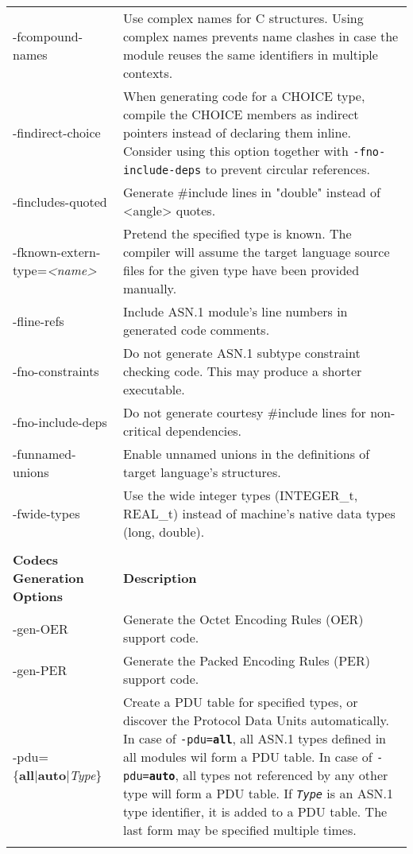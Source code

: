 \documentclass[english,oneside,12pt]{book}
\begin{document}
\begin{longtable}{lp{4in}}
{\ttfamily -fcompound-names} & {\small Use complex names for C structures. Using complex names prevents
name clashes in case the module reuses the same identifiers in multiple
contexts.}\\
{\ttfamily -findirect-choice} & {\small When generating code for a CHOICE type, compile the CHOICE
members as indirect pointers instead of declaring them inline. Consider
using this option together with \texttt{-fno-include-deps}
to prevent circular references.}\\
{\ttfamily -fincludes-quoted} & {\small Generate \#include lines in "double" instead of <angle> quotes.}\\
{\ttfamily -fknown-extern-type=\emph{<name>}} & {\small Pretend the specified type is known. The compiler will assume
the target language source files for the given type have been provided
manually. }\\
{\ttfamily -fline-refs} & {\small Include ASN.1 module's line numbers in generated code comments.}\\
{\ttfamily -fno-constraints} & {\small Do not generate ASN.1 subtype constraint checking code. This
may produce a shorter executable.}\\
{\ttfamily -fno-include-deps} & {\small Do not generate courtesy \#include lines for non-critical dependencies.}\\
{\ttfamily -funnamed-unions} & {\small Enable  unnamed  unions in the definitions of target language's structures.}\\
{\ttfamily -fwide-types} & {\small Use the wide integer types (INTEGER\_t, REAL\_t) instead of machine's native data types (long, double). }\\\\
\textbf{Codecs Generation Options} & \textbf{Description}\\
\midrule
{\ttfamily -gen-OER} & {\small Generate the Octet Encoding Rules (OER) support code.}\\
{\ttfamily -gen-PER} & {\small Generate the Packed Encoding Rules (PER) support code.}\\
{\ttfamily -pdu=\{\textbf{all}|\textbf{auto}|\emph{Type}\}} & {\small Create a PDU table for specified types, or discover the Protocol Data Units automatically.
In case of \texttt{-pdu=\textbf{all}}, all ASN.1 types defined in all modules wil form a PDU table. In case of \texttt{-pdu=\textbf{auto}}, all types not referenced by any other type will form a PDU table. If \texttt{\emph{Type}} is an ASN.1 type identifier, it is added to a PDU table. The last form may be specified multiple times.}\\ \\

\end{longtable}
\end{document}
